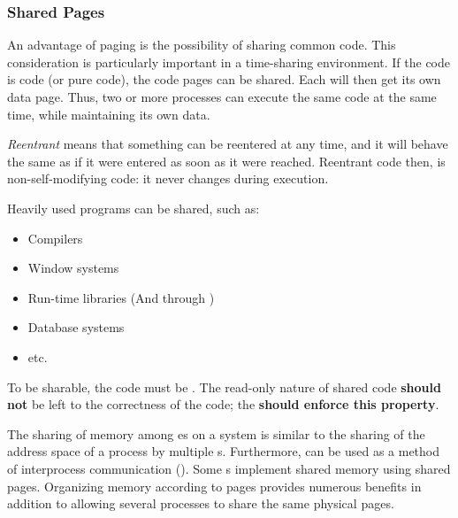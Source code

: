 \subsubsection{Shared Pages}\label{subsubsec:Shared_Pages}
An advantage of paging is the possibility of sharing common code.
This consideration is particularly important in a time-sharing environment.
If the code is  code (or pure code), the code pages can be shared.
Each  will then get its own data page.
Thus, two or more processes can execute the same code at the same time, while maintaining its own data.

\begin{definition}[Reentrant]\label{def:Reentrant}
  \emph{Reentrant} means that something can be reentered at any time, and it will behave the same as if it were entered as soon as it were reached.
  Reentrant code then, is non-self-modifying code: it never changes during execution.
\end{definition}

Heavily used programs can be shared, such as:
\begin{itemize}[noitemsep]
\item Compilers
\item Window systems
\item Run-time libraries (And through )
\item Database systems
\item etc.
\end{itemize}

To be sharable, the code must be .
The read-only nature of shared code \textbf{should not} be left to the correctness of the code; the \textbf{ should enforce this property}.

The sharing of memory among es on a system is similar to the sharing of the address space of a process by multiple s.
Furthermore,  can be used as a method of interprocess communication ().
Some s implement shared memory using shared pages.
Organizing memory according to pages provides numerous benefits in addition to allowing several processes to share the same physical pages.

